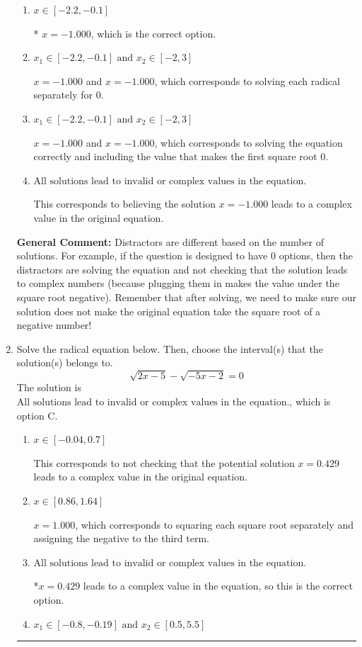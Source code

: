 \documentclass{extbook}[14pt]
\newcommand{\litem}[1]{\item #1

\rule{\textwidth}{0.4pt}}
\begin{document}
\begin{enumerate}
{\begin{enumerate}[label=\Alph*.]
$x = 0.333$, which corresponds to squaring each square root separately and assigning the negative to the third term.
\item \( x \in [-2.2,-0.1] \)

* $x = -1.000$, which is the correct option.
\item \( x_1 \in [-2.2, -0.1] \text{ and } x_2 \in [-2,3] \)

$x = -1.000$ and $x = -1.000$, which corresponds to solving each radical separately for 0.
\item \( x_1 \in [-2.2, -0.1] \text{ and } x_2 \in [-2,3] \)

$x = -1.000$ and $x = -1.000$, which corresponds to solving the equation correctly and including the value that makes the first square root 0.
\item \( \text{All solutions lead to invalid or complex values in the equation.} \)

This corresponds to believing the solution $x = -1.000$ leads to a complex value in the original equation.
\end{enumerate}

\textbf{General Comment:} Distractors are different based on the number of solutions. For example, if the question is designed to have 0 options, then the distractors are solving the equation and not checking that the solution leads to complex numbers (because plugging them in makes the value under the square root negative). Remember that after solving, we need to make sure our solution does not make the original equation take the square root of a negative number!
}
\litem{
Solve the radical equation below. Then, choose the interval(s) that the solution(s) belongs to.
\[ \sqrt{2 x - 5} - \sqrt{-5 x - 2} = 0 \]The solution is \( \text{All solutions lead to invalid or complex values in the equation.} \), which is option C.\begin{enumerate}[label=\Alph*.]
\item \( x \in [-0.04,0.7] \)

This corresponds to not checking that the potential solution $x = 0.429$ leads to a complex value in the original equation.
\item \( x \in [0.86,1.64] \)

$x = 1.000$, which corresponds to squaring each square root separately and assigning the negative to the third term.
\item \( \text{All solutions lead to invalid or complex values in the equation.} \)

*$x = 0.429$ leads to a complex value in the equation, so this is the correct option.
\item \( x_1 \in [-0.8, -0.19] \text{ and } x_2 \in [0.5,5.5] \)


\end{enumerate}}
\end{enumerate}
\end{document}
